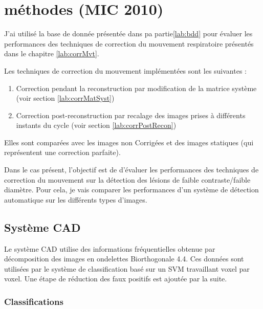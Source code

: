 \chapter{méthodes (MIC 2010)}

J'ai utilisé la base de donnée présentée dans pa partie\ref{lab:bdd} pour évaluer les performances des techniques de correction du mouvement respiratoire présentés dans le chapitre \ref{lab:corrMvt}. 

Les techniques de correction du mouvement implémentées sont les suivantes :

\begin{enumerate}
 \item Correction pendant la reconstruction par modification de la matrice système (voir section \ref{lab:corrMatSyst})
 \item Correction post-reconstruction par recalage des images prises à différents instants du cycle (voir section \ref{lab:corrPostRecon})
\end{enumerate}

Elles sont comparées avec les images non Corrigées et des images statiques (qui représentent une correction parfaite).

Dans le cas présent, l'objectif est de d'évaluer les performances des techniques de correction du mouvement sur la détection des lésions de faible contraste/faible diamètre. Pour cela, je vais comparer les performances d'un système de détection automatique sur les différents types d'images.

\section{Système CAD}

Le système CAD utilise des informations fréquentielles obtenue par décomposition des images en ondelettes Biorthogonale 4.4. Ces données sont utilisées par le système de classification basé sur un SVM travaillant voxel par voxel. Une étape de réduction des faux positifs est ajoutée par la suite.

\subsection{Classifications}

